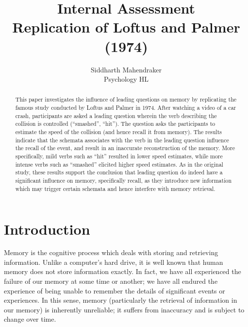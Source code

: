 \documentclass[a4paper,11pt]{report}
\title{Internal Assessment\\
    Replication of Loftus and Palmer (1974)}
\author{Siddharth Mahendraker\\
    Psychology HL\\}
\begin{document}
\maketitle

\begin{abstract}
This paper investigates the influence of leading questions on memory by
replicating the famous study conducted by Loftus and Palmer in 1974. After
watching a video of a car crash, participants are asked a leading question
wherein the verb describing the collision is controlled (“smashed”, “hit”).
The question asks the participants to estimate the speed of the collision
(and hence recall it from memory). The results indicate that the schemata
associates with the verb in the leading question influence the recall of
the event, and result in an inaccurate reconstruction of the memory. More
specifically, mild verbs such as “hit” resulted in lower speed estimates,
while more intense verbs such as “smashed” elicited higher speed estimates.
As in the original study, these results support the conclusion that leading
question do indeed have a significant influence on memory, specifically
recall, as they introduce new information which may trigger certain schemata
and hence interfere with memory retrieval.
\end{abstract}

\setcounter{secnumdepth}{3}
\renewcommand{\thesection}{\arabic{section}}
\renewcommand{\cftsecfont}{\bfseries}
\setlength\cftbeforesecskip{3pt}
\setlength\cftbeforesubsecskip{3pt}

\newcommand{\fnt}[1]{%
\addtocounter{fn}{1}%
\footnote[\value{fn}]{#1}}

\setcounter{page}{1}
\tableofcontents
\clearpage
\setcounter{page}{1}

\section{Introduction}

Memory is the cognitive process which deals with storing and retrieving
information. Unlike a computer’s hard drive, it is well known that human memory
does not store information exactly. In fact, we have all experienced the
failure of our memory at some time or another; we have all endured the
experience of being unable to remember the details of significant events or
experiences. In this sense, memory (particularly the retrieval of information
in our memory) is inherently unreliable; it suffers from inaccuracy and is
subject to change over time.
\end{document}
